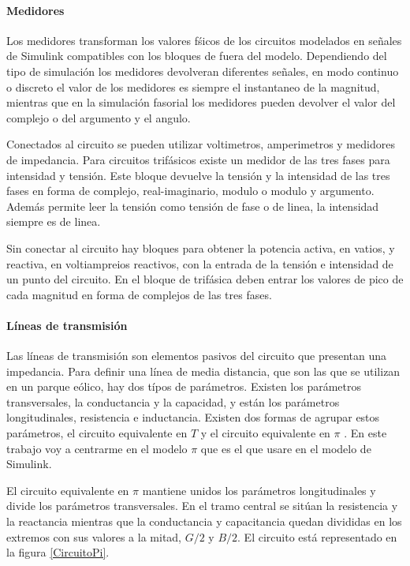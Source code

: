 \documentclass{book}
\begin{document}
		\paragraph {Medidores}
Los medidores transforman los valores f\'sicos de los circuitos modelados en señales de Simulink compatibles con los bloques de fuera del modelo. Dependiendo del tipo de simulaci\'on los medidores devolveran diferentes señales, en modo continuo o discreto el valor de los medidores es siempre el instantaneo de la magnitud, mientras que en la simulaci\'on fasorial los medidores pueden devolver el valor del complejo o del argumento y el angulo. \par

Conectados al circuito se pueden utilizar voltimetros, amperimetros y medidores de impedancia. Para circuitos trif\'asicos existe un medidor de las tres fases para intensidad y tensi\'on. Este bloque devuelve la tensi\'on y la intensidad de las tres fases en forma de complejo, real-imaginario, modulo o modulo y argumento. Adem\'as permite leer la tensi\'on como tensi\'on de fase o de linea, la intensidad siempre es de linea. \par

Sin conectar al circuito hay bloques para obtener la potencia activa, en vatios, y reactiva, en voltiampreios reactivos, con la entrada de la tensi\'on e intensidad de un punto del circuito. En el bloque de trif\'asica deben entrar los valores de pico de cada magnitud en forma de complejos de las tres fases. \par
 
		\paragraph {L\'ineas de transmisi\'on}
Las l\'ineas de transmisi\'on son elementos pasivos del circuito que presentan una impedancia. Para definir una l\'inea de media distancia, que son las que se utilizan en un parque e\'olico, hay dos t\'ipos de par\'ametros. Existen los par\'ametros transversales, la conductancia y la capacidad, y est\'an los  par\'ametros longitudinales, resistencia e inductancia. Existen dos formas de agrupar estos par\'ametros, el circuito equivalente en $T$ y el circuito equivalente en $\pi$ \cite{LibroRedesLineas}. En este trabajo voy a centrarme en el modelo $\pi$ que es el que usare en el modelo de Simulink.  \par

El circuito equivalente en $\pi$ mantiene unidos los par\'ametros longitudinales y divide los par\'ametros transversales. En el tramo central se sit\'uan la resistencia y la reactancia mientras que la conductancia y capacitancia quedan divididas en los extremos con sus valores a la mitad, $G/2$ y $B/2$. El circuito est\'a representado en la figura \ref{CircuitoPi}. \par 
\end{document}
